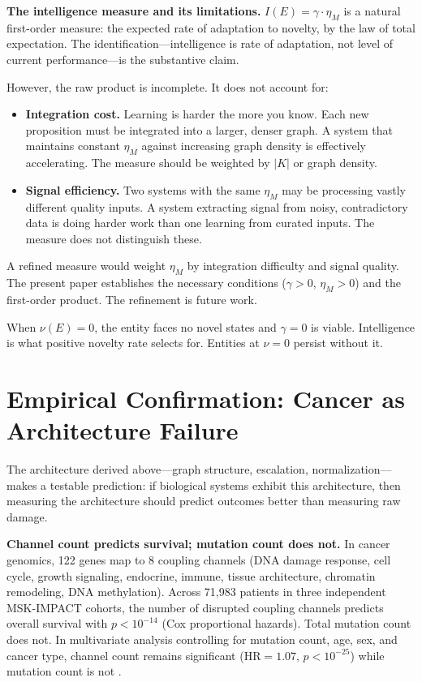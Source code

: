 \documentclass[11pt]{article}
\theoremstyle{definition}
\theoremstyle{remark}
\begin{document}
\textbf{The intelligence measure and its limitations.}
$I(E) = \gamma \cdot \eta_M$ is a natural first-order measure: the
expected rate of adaptation to novelty, by the law of total expectation.
The identification---intelligence is rate of adaptation, not level of
current performance---is the substantive claim.

However, the raw product is incomplete. It does not account for:
\begin{itemize}
\item \textbf{Integration cost.} Learning is harder the more you know.
   Each new proposition must be integrated into a larger, denser graph.
   A system that maintains constant $\eta_M$ against increasing graph
   density is effectively accelerating. The measure should be weighted
   by $|K|$ or graph density.
\item \textbf{Signal efficiency.} Two systems with the same $\eta_M$
   may be processing vastly different quality inputs. A system
   extracting signal from noisy, contradictory data is doing harder work
   than one learning from curated inputs. The measure does not
   distinguish these.
\end{itemize}
A refined measure would weight $\eta_M$ by integration difficulty and
signal quality. The present paper establishes the necessary conditions
($\gamma > 0$, $\eta_M > 0$) and the first-order product. The
refinement is future work.

When $\nu(E) = 0$, the entity faces no novel states and $\gamma = 0$
is viable. Intelligence is what positive novelty rate selects for.
Entities at $\nu = 0$ persist without it.

\section{Empirical Confirmation: Cancer as Architecture Failure}
\label{sec:empirical}

The architecture derived above---graph structure, escalation,
normalization---makes a testable prediction: if biological systems
exhibit this architecture, then measuring the architecture should
predict outcomes better than measuring raw damage.

\textbf{Channel count predicts survival; mutation count does not.}
In cancer genomics, 122 genes map to 8 coupling channels (DNA damage
response, cell cycle, growth signaling, endocrine, immune,
tissue architecture, chromatin remodeling, DNA methylation). Across
71,983 patients in three independent MSK-IMPACT cohorts, the number
of disrupted coupling channels predicts overall survival with
$p < 10^{-14}$ (Cox proportional hazards). Total mutation count does
not. In multivariate analysis controlling for mutation count, age,
sex, and cancer type, channel count remains significant
($\text{HR} = 1.07$, $p < 10^{-25}$) while mutation count is not
\cite{McCarthy2026e}.
\end{document}
